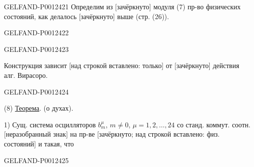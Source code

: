 \begin{GelfandAdjacentEvidence}{GELFAND-P001242}{1}
Определим из [зачёркнуто] модуля (7) пр-во физических состояний, как делалось [зачёркнуто] выше (стр. (26)).
\end{GelfandAdjacentEvidence}
\begin{GelfandAdjacentEvidence}{GELFAND-P001242}{2}

\end{GelfandAdjacentEvidence}
\begin{GelfandAdjacentEvidence}{GELFAND-P001242}{3}


Конструкция зависит [над строкой вставлено: только] от [зачёркнуто] действия алг. Вирасоро.
\end{GelfandAdjacentEvidence}
\begin{GelfandAdjacentEvidence}{GELFAND-P001242}{4}


(8) \underline{Теорема}. (о духах).

1) Сущ. система осцилляторов $b_m^\mu$, $m\ne0$, $\mu=1,2,\ldots,24$
со станд. коммут. соотн. [неразобранный знак] на пр-ве [зачёркнуто; над строкой вставлено: физ. состояний] и такая, что
\end{GelfandAdjacentEvidence}
\begin{GelfandAdjacentEvidence}{GELFAND-P001242}{5}

\end{GelfandAdjacentEvidence}
